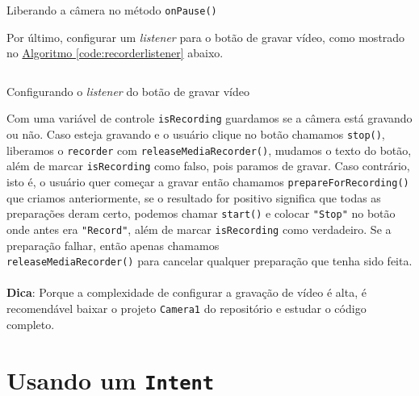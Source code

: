 \documentclass[a4paper,12pt,brazil,oneside]{book}
\begin{document}
		\begin{listing}[H]
		\inputminted[linenos=true,fontsize=\small,frame=lines, framesep=2mm, tabsize=2,numbersep=5pt]{java}{src/api/camera/releaseCam.java}
		\caption{Liberando a câmera no método \texttt{onPause()}}
		\label{code:releaserecorder2}
		\end{listing} 			

		Por último, configurar um \emph{listener} para o botão de gravar vídeo, como mostrado no \hyperref[code:recorderlistener]{Algoritmo \ref*{code:recorderlistener}} abaixo. 

		\begin{listing}[H]
		\inputminted[linenos=true,fontsize=\small,frame=lines, framesep=2mm, tabsize=2,numbersep=5pt]{java}{src/api/camera/recordlistener.java}
		\caption{Configurando o \emph{listener} do botão de gravar vídeo}
		\label{code:recorderlistener}
		\end{listing} 			

		Com uma variável de controle \texttt{isRecording} guardamos se a câmera está gravando ou não. Caso esteja gravando e o usuário clique no botão chamamos \texttt{stop()}, liberamos o \texttt{recorder} com \texttt{releaseMediaRecorder()}, mudamos o texto do botão, além de marcar \texttt{isRecording} como falso, pois paramos de gravar. Caso contrário, isto é, o usuário quer começar a gravar então chamamos \texttt{prepareForRecording()} que criamos anteriormente, se o resultado for positivo significa que todas as preparações deram certo, podemos chamar \texttt{start()} e colocar \texttt{"Stop"} no botão onde antes era \texttt{"Record"}, além de marcar \texttt{isRecording} como verdadeiro. Se a preparação falhar, então apenas chamamos \\ \texttt{releaseMediaRecorder()} para cancelar qualquer preparação que tenha sido feita.

\begin{framed}
\paragraph{}\textbf{Dica}: Porque a complexidade de configurar a gravação de vídeo é alta, é recomendável baixar o projeto \texttt{Camera1} do repositório e estudar o código completo.
\textit{}
\end{framed}

	\section{Usando um \texttt{Intent}}
\end{document}
